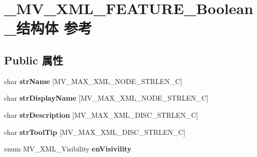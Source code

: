 \hypertarget{struct___m_v___x_m_l___f_e_a_t_u_r_e___boolean__}{}\section{\+\_\+\+M\+V\+\_\+\+X\+M\+L\+\_\+\+F\+E\+A\+T\+U\+R\+E\+\_\+\+Boolean\+\_\+结构体 参考}
\label{struct___m_v___x_m_l___f_e_a_t_u_r_e___boolean__}
\subsection*{Public 属性}
\begin{DoxyCompactItemize}
\item 
\mbox{\label{struct___m_v___x_m_l___f_e_a_t_u_r_e___boolean___a3e6c04dc5ff22317553bcaecbcf614e6}} 
char {\bfseries str\+Name} \mbox{[}M\+V\+\_\+\+M\+A\+X\+\_\+\+X\+M\+L\+\_\+\+N\+O\+D\+E\+\_\+\+S\+T\+R\+L\+E\+N\+\_\+C\mbox{]}
\item 
\mbox{\label{struct___m_v___x_m_l___f_e_a_t_u_r_e___boolean___aefc69df31cd511024d4bc6d2219df82a}} 
char {\bfseries str\+Display\+Name} \mbox{[}M\+V\+\_\+\+M\+A\+X\+\_\+\+X\+M\+L\+\_\+\+N\+O\+D\+E\+\_\+\+S\+T\+R\+L\+E\+N\+\_\+C\mbox{]}
\item 
\mbox{\label{struct___m_v___x_m_l___f_e_a_t_u_r_e___boolean___a93abe6f63d749950b8f353e5b9cc1f76}} 
char {\bfseries str\+Description} \mbox{[}M\+V\+\_\+\+M\+A\+X\+\_\+\+X\+M\+L\+\_\+\+D\+I\+S\+C\+\_\+\+S\+T\+R\+L\+E\+N\+\_\+C\mbox{]}
\item 
\mbox{\label{struct___m_v___x_m_l___f_e_a_t_u_r_e___boolean___aa864c8fa3a118fc4ee7abdd633bc8564}} 
char {\bfseries str\+Tool\+Tip} \mbox{[}M\+V\+\_\+\+M\+A\+X\+\_\+\+X\+M\+L\+\_\+\+D\+I\+S\+C\+\_\+\+S\+T\+R\+L\+E\+N\+\_\+C\mbox{]}
\item 
\mbox{\label{struct___m_v___x_m_l___f_e_a_t_u_r_e___boolean___acb19adb676ee675729c430e8965d07bc}} 
enum M\+V\+\_\+\+X\+M\+L\+\_\+\+Visibility {\bfseries en\+Visivility}

\end{DoxyCompactItemize}
